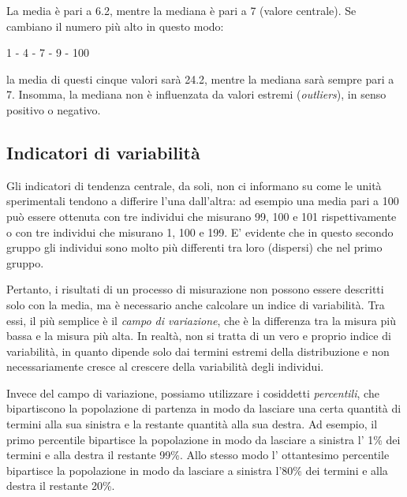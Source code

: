 \documentclass[a4paper,12pt,oneside]{book}
\newenvironment{Shaded}{\begin{snugshade}}{\end{snugshade}}
\newcommand{\KeywordTok}[1]{\textcolor[rgb]{0.13,0.29,0.53}{\textbf{#1}}}
\newcommand{\OperatorTok}[1]{\textcolor[rgb]{0.81,0.36,0.00}{\textbf{#1}}}
\newcommand{\NormalTok}[1]{#1}
\theoremstyle{definition}
\theoremstyle{definition}
\theoremstyle{definition}
\theoremstyle{remark}
\begin{document}
La media è pari a 6.2, mentre la mediana è pari a 7 (valore centrale).
Se cambiano il numero più alto in questo modo:

1 - 4 - 7 - 9 - 100

la media di questi cinque valori sarà 24.2, mentre la mediana sarà
sempre pari a 7. Insomma, la mediana non è influenzata da valori estremi
(\emph{outliers}), in senso positivo o negativo.

\begin{Shaded}
\end{Shaded}

\subsection*{Indicatori di variabilità}\label{indicatori-di-variabilita}

Gli indicatori di tendenza centrale, da soli, non ci informano su come
le unità sperimentali tendono a differire l'una dall'altra: ad esempio
una media pari a 100 può essere ottenuta con tre individui che misurano
99, 100 e 101 rispettivamente o con tre individui che misurano 1, 100 e
199. E' evidente che in questo secondo gruppo gli individui sono molto
più differenti tra loro (dispersi) che nel primo gruppo.

Pertanto, i risultati di un processo di misurazione non possono essere
descritti solo con la media, ma è necessario anche calcolare un indice
di variabilità. Tra essi, il più semplice è il \emph{campo di
variazione}, che è la differenza tra la misura più bassa e la misura più
alta. In realtà, non si tratta di un vero e proprio indice di
variabilità, in quanto dipende solo dai termini estremi della
distribuzione e non necessariamente cresce al crescere della variabilità
degli individui.

Invece del campo di variazione, possiamo utilizzare i cosiddetti
\emph{percentili}, che bipartiscono la popolazione di partenza in modo
da lasciare una certa quantità di termini alla sua sinistra e la
restante quantità alla sua destra. Ad esempio, il primo percentile
bipartisce la popolazione in modo da lasciare a sinistra l' 1\% dei
termini e alla destra il restante 99\%. Allo stesso modo l' ottantesimo
percentile bipartisce la popolazione in modo da lasciare a sinistra
l'80\% dei termini e alla destra il restante 20\%.
\end{document}
